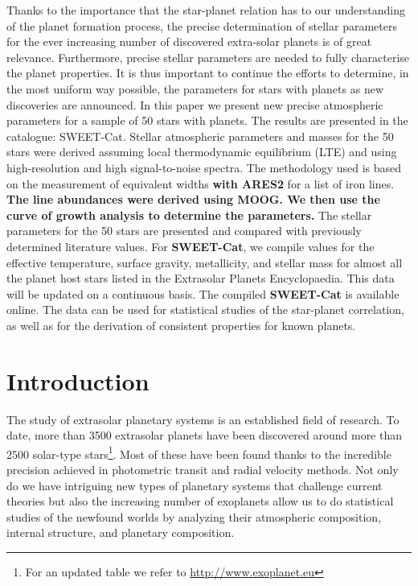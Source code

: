 \documentclass{aa}
\begin{document}
\abstract
{Thanks to the importance that the star-planet relation has to our understanding
of the planet formation process, the precise determination of stellar parameters
for the ever increasing number of discovered extra-solar planets is of great
relevance. Furthermore, precise stellar parameters are needed to fully
characterise the planet properties. It is thus important to continue the efforts
to determine, in the most uniform way possible, the parameters for stars with
planets as new discoveries are announced.}
{In this paper we present new precise atmospheric parameters for a sample of 50
stars with planets. The results are presented in the catalogue: SWEET-Cat.}
{Stellar atmospheric parameters and masses for the 50 stars were derived
assuming local thermodynamic equilibrium (LTE) and using high-resolution and
high signal-to-noise spectra. The methodology used is based on the measurement
of equivalent widths {\bf with ARES2} for a list of iron lines. {\bf The line
abundances were derived using MOOG. We then use the curve of growth analysis to
determine the parameters.}}
{The stellar parameters for the 50 stars are presented and compared with
previously determined literature values. For {\bf SWEET-Cat}, we compile values
for the effective temperature, surface gravity, metallicity, and stellar mass
for almost all the planet host stars listed in the Extrasolar Planets
Encyclopaedia. This data will be updated on a continuous basis. The compiled
{\bf SWEET-Cat} is available online. The data can be used for statistical studies of
the star-planet correlation, as well as for the derivation of consistent
properties for known planets.}
{}



\maketitle



\section{Introduction}
\label{sec:introduction}
The study of extrasolar planetary systems is an established field of research.
To date, more than 3500 extrasolar planets have been discovered around more than
2500 solar-type stars\footnote{For an updated table we refer to
\url{http://www.exoplanet.eu}}. Most of these have been found thanks to the
incredible precision achieved in photometric transit and radial velocity
methods. Not only do we have intriguing new types of planetary systems that
challenge current theories but also the increasing number of exoplanets allow us
to do statistical studies of the newfound worlds by analyzing their atmospheric
composition, internal structure, and planetary composition.
\end{document}

